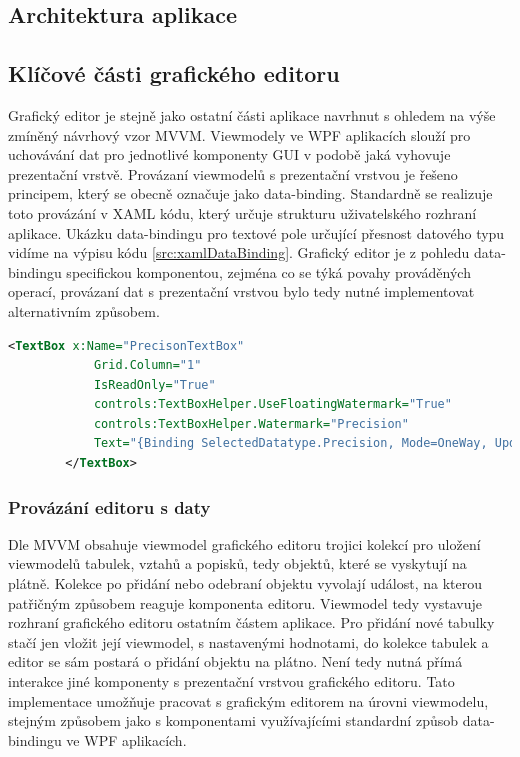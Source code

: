 \documentclass[czech,bachelor,public,dept460,male,oneside]{diploma}
\begin{document}
	\subsection{Architektura aplikace}
	
	\subsection{Klíčové části grafického editoru}
	Grafický editor je stejně jako ostatní části aplikace navrhnut s ohledem na výše zmíněný návrhový vzor MVVM. Viewmodely ve WPF aplikacích slouží pro uchovávání dat pro jednotlivé komponenty GUI v podobě jaká vyhovuje prezentační vrstvě. Provázaní viewmodelů s prezentační vrstvou je řešeno principem, který se obecně označuje jako data-binding. Standardně se realizuje toto provázání v XAML kódu, který určuje strukturu uživatelského rozhraní aplikace. Ukázku data-bindingu pro textové pole určující přesnost datového typu vidíme na výpisu kódu \ref{src:xamlDataBinding}. Grafický editor je z pohledu data-bindingu specifickou komponentou, zejména co se týká povahy prováděných operací, provázaní dat s prezentační vrstvou bylo tedy nutné implementovat alternativním způsobem. 
		
		\begin{lstlisting}[language=xml,label=src:xamlDataBinding,caption=Příklad data-bindingu v XAML pro textové pole]
		<TextBox x:Name="PrecisonTextBox"
			Grid.Column="1"
			IsReadOnly="True"
			controls:TextBoxHelper.UseFloatingWatermark="True"
			controls:TextBoxHelper.Watermark="Precision"
			Text="{Binding SelectedDatatype.Precision, Mode=OneWay, UpdateSourceTrigger=PropertyChanged}">
		</TextBox>
		\end{lstlisting}
		
		\subsubsection{Provázání editoru s daty}
		Dle MVVM obsahuje viewmodel grafického editoru trojici kolekcí pro uložení viewmodelů tabulek, vztahů a popisků, tedy objektů, které se vyskytují na plátně. Kolekce po přidání nebo odebraní objektu vyvolají událost, na kterou patřičným způsobem reaguje komponenta editoru. Viewmodel tedy vystavuje rozhraní grafického editoru ostatním částem aplikace. Pro přidání nové tabulky stačí jen vložit její viewmodel, s nastavenými hodnotami, do kolekce tabulek a editor se sám postará o přidání objektu na plátno. Není tedy nutná přímá interakce jiné komponenty s prezentační vrstvou grafického editoru. Tato implementace umožňuje pracovat s grafickým editorem na úrovni viewmodelu, stejným způsobem jako s komponentami využívajícími standardní způsob data-bindingu ve WPF aplikacích. 
		
\end{document}
